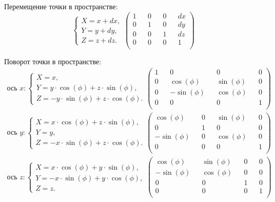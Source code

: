 Перемещение точки в пространстве:
\begin{equation*}
	\begin{cases}
		X = x + dx, \\
		Y = y + dy, \\
		Z = z + dz.
	\end{cases}
	\begin{pmatrix}
		1 && 0 && 0 && dx \\
		0 && 1 && 0 && dy \\
		0 && 0 && 1 && dz \\
		0 && 0 && 0 && 1 \\
	\end{pmatrix}
\end{equation*}

Поворот точки в пространстве:
\begin{align*}
	\text{ось } x: 
	\begin{cases}
		X = x, \\
		Y = y \cdot \cos(\phi) + z \cdot \sin(\phi), \\
		Z = - y \cdot \sin(\phi) + z \cdot \cos(\phi).
	\end{cases}
	\begin{pmatrix}
		1 && 0 && 0 && 0 \\
		0 && \cos(\phi) && \sin(\phi) && 0 \\
		0 && -\sin(\phi) && \cos(\phi) && 0 \\
		0 && 0 && 0 && 1 \\
	\end{pmatrix} \\
	\text{ось }  y: 
	\begin{cases}
		X = x \cdot \cos(\phi) + z \cdot \sin(\phi), \\
		Y = y, \\
		Z = - x \cdot \sin(\phi) + z \cdot \cos(\phi).
	\end{cases}
	\begin{pmatrix}
		\cos(\phi) && 0 && \sin(\phi) && 0 \\
		0 && 1 && 0 && 0 \\
		-\sin(\phi) && 0 && \cos(\phi) && 0 \\
		0 && 0 && 0 && 1 \\
	\end{pmatrix} \\
	\text{ось }  z: 
	\begin{cases}
		X = x \cdot \cos(\phi) + y \cdot \sin(\phi), \\
		Y = - x \cdot \sin(\phi) + y \cdot \cos(\phi), \\
		Z = z.
	\end{cases}
	\begin{pmatrix}
		\cos(\phi) && \sin(\phi) && 0 && 0 \\
		-\sin(\phi) && \cos(\phi) && 0 && 0 \\
		0 && 0 && 1 && 0 \\
		0 && 0 && 0 && 1 \\
	\end{pmatrix} \\
\end{align*}


